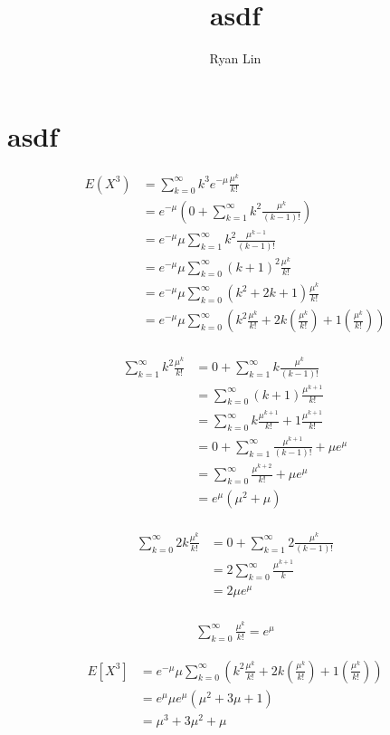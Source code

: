 \documentclass{report}
\title{asdf}
\author{Ryan Lin}
\date{}
\begin{document}
\maketitle
\section{asdf}

\begin{align*}
E(X^{3}) &= \sum_{k=0}^{\infty }k^{3}e^{-\mu} \frac{\mu^{k}}{k!} \\
&= e^{-\mu}(0 + \sum_{k=1}^{\infty }k^{2} \frac{\mu^{k}}{(k-1)!}) \\
&= e^{-\mu} \mu \sum_{k=1}^{\infty }k^{2} \frac{\mu^{k-1}}{(k-1)!} \\
&= e^{-\mu} \mu \sum_{k=0}^{\infty} (k+1)^{2} \frac{\mu^{k}}{k!} \\
&= e^{-\mu} \mu \sum_{k=0}^{\infty} (k^{2} + 2k +1) \frac{\mu^{k}}{k!} \\
&= e^{-\mu} \mu \sum_{k=0}^{\infty} (k^{2} \frac{\mu^{k}}{k!} +  2k (\frac{\mu^{k}}{k!})    +1 (\frac{\mu^{k}}{k!}) ) \\
\end{align*}

\begin{align*}
\sum_{k=1}^{\infty }k^{2} \frac{\mu^{k}}{k!} &= 0 + \sum_{k=1}^{\infty }k \frac{\mu^{k}}{(k-1)!} \\
&= \sum_{k=0}^{\infty }(k+1) \frac{\mu^{k+1}}{k!}  \\
&= \sum_{k=0}^{\infty }k \frac{\mu^{k+1}}{k!} + 1 \frac{\mu^{k+1}}{k!} \\ 
&= 0 + \sum_{k=1}^{\infty} \frac{\mu^{k+1}}{(k-1)!} + \mu e^{\mu} \\
&= \sum_{k=0}^{\infty } \frac{\mu^{k+2}}{k!} + \mu e^{\mu}\\
&= e^{\mu}(\mu^{2} + \mu) \\
\end{align*}

\begin{align*}
	\sum_{k=0}^{\infty } 2k \frac{\mu^{k}}{k!} &= 0 + \sum_{k=1}^{\infty} 2 \frac{\mu^{k}}{(k-1)!} \\
	&= 2 \sum_{k=0}^{\infty }\frac{\mu^{k+1}}{k} \\
	&= 2\mu e^{\mu} \\
\end{align*}

\begin{align*}
	\sum_{k=0}^{\infty } \frac{\mu^{k}}{k!} = e^{\mu}
\end{align*}

\begin{align*}
	
E[X^{3}] &= e^{-\mu} \mu \sum_{k=0}^{\infty} (k^{2} \frac{\mu^{k}}{k!} +  2k (\frac{\mu^{k}}{k!})    +1 (\frac{\mu^{k}}{k!}) ) \\
&= e^{\mu}\mu e^{\mu} (\mu^{2} + 3\mu + 1) \\
&= \mu^{3} + 3\mu^{2} + \mu \\
\end{align*}
\end{document}
